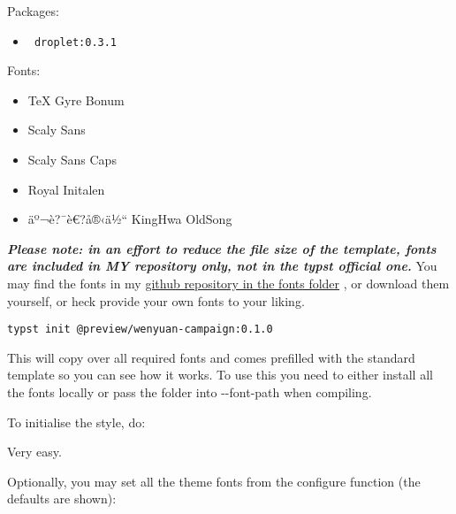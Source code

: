 Packages:

\begin{itemize}
\tightlist
\item
  \texttt{\ droplet:0.3.1\ }
\end{itemize}

Fonts:

\begin{itemize}
\tightlist
\item
  TeX Gyre Bonum
\item
  Scaly Sans
\item
  Scaly Sans Caps
\item
  Royal Initalen
\item
  äº¬è?¯è€?å®‹ä½`` KingHwa OldSong
\end{itemize}

\emph{\textbf{Please note: in an effort to reduce the file size of the
template, fonts are included in MY repository only, not in the typst
official one.}} You may find the fonts in my
\href{https://github.com/yanwenywan/typst-packages/tree/master/wenyuan-campaign/0.1.0/template/fonts}{github
repository in the fonts folder} , or download them yourself, or heck
provide your own fonts to your liking.

\begin{verbatim}
typst init @preview/wenyuan-campaign:0.1.0
\end{verbatim}

This will copy over all required fonts and comes prefilled with the
standard template so you can see how it works. To use this you need to
either install all the fonts locally or pass the folder into
-\/-font-path when compiling.

To initialise the style, do:

\begin{Shaded}
\begin{Highlighting}[]

\end{Highlighting}
\end{Shaded}

Very easy.

Optionally, you may set all the theme fonts from the configure function
(the defaults are shown):

\begin{Shaded}
\begin{Highlighting}[]

\NormalTok{) }
\end{Highlighting}
\end{Shaded}

